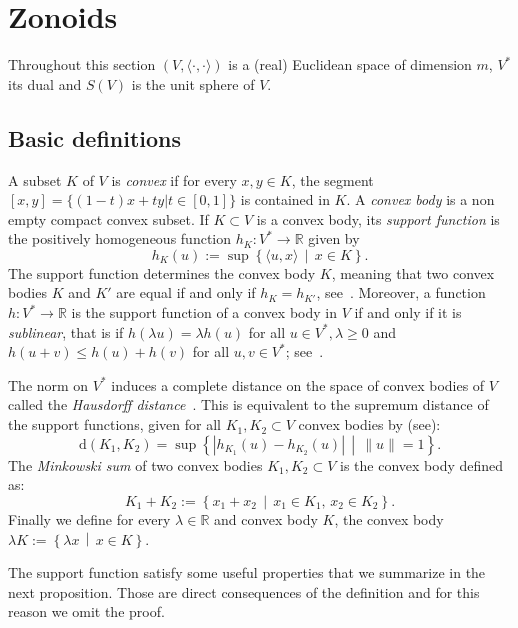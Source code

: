 \documentclass[AHL, Unicode, longabstracts, published]{cedram}
\newcommand{\R}{\mathbb{R}}
\newcommand{\dd}{\mathrm{d}}
\newcommand{\set}[2]{\left\{ #1 \, \middle| \, #2\right\}}
\begin{document}
\section{Zonoids}\label{sec:zonoids}

Throughout this section $(V, \langle \cdot, \cdot \rangle)$ is a (real) Euclidean space of dimension $m$, $V^*$ its dual and $S(V)$ is the unit sphere of $V$.

\subsection{Basic definitions}

A subset $K$ of $V$ is \emph{convex} if for every $x,y\in K$, the segment $[x,y]=\{(1-t)x+ty | t\in[0,1]\}$ is contained in $K$. A \emph{convex body} is a non empty compact convex subset. If $K\subset V$ is a convex body, its \emph{support function} is the positively homogeneous function $h_K: V^*\to \R$ given by
\begin{equation*}
h_K(u):=\sup\set{\langle u, x\rangle}{x\in K}.
\end{equation*}
The support function determines the convex body $K$, meaning that two convex bodies $K$ and $K'$ are equal if and only if $h_{K}=h_{K'}$, see~\cite[Section~1.7.1]{bible}. Moreover, a function $h:V^*\to \R$ is the support function of a convex body in $V$ if and only if it is \emph{sublinear}, that is if $h(\lambda u)=\lambda h(u)$ for all $u\in V^*, \lambda \geq 0$ and $h(u+v)\leq h(u)+h(v)$ for all $u,v\in V^*$; see~\cite[Theorem~1.7.1]{bible}.

The norm on $V^*$ induces a complete distance on the space of convex bodies of $V$ called the \emph{Hausdorff distance}~\cite{hausdorff1914grundzuge}. This is equivalent to the supremum distance of the support functions, given for all $K_1,K_2\subset V$ convex bodies by (see\cite[Lemma~1.8.14]{bible}):
\begin{equation}\label{eq:Hausdist}
\dd(K_1,K_2)=\sup\set{|h_{K_1}(u)-h_{K_2}(u)|}{\|u\|=1}.
\end{equation}
The \emph{Minkowski sum} of two convex bodies $K_1,K_2\subset V$ is the convex body defined as:
\begin{equation*}
K_1+K_2:=\set{x_1+x_2}{x_1\in K_1, \, x_2\in K_2}.
\end{equation*}
Finally we define for every $\lambda\in \R$ and convex body $K$, the convex body $\lambda K:=\set{\lambda x}{x\in K}$.

The support function satisfy some useful properties that we summarize in the next proposition. Those are direct consequences of the definition and for this reason we omit the proof.
\end{document}

